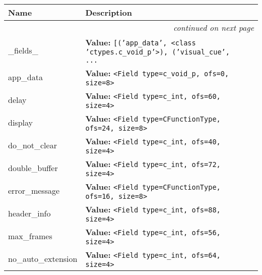     \vspace{-1cm}
\hspace{\varindent}\begin{longtable}{|p{\varnamewidth}|p{\vardescrwidth}|l}
\cline{1-2}
\cline{1-2} \centering \textbf{Name} & \centering \textbf{Description}& \\
\cline{1-2}
\endhead\cline{1-2}\multicolumn{3}{r}{\small\textit{continued on next page}}\\\endfoot\cline{1-2}
\endlastfoot\raggedright \_\-f\-i\-e\-l\-d\-s\-\_\- & \raggedright \textbf{Value:} 
{\tt \texttt{[}\texttt{(}\texttt{'}\texttt{app\_data}\texttt{'}\texttt{, }{\textless}class 'ctypes.c\_void\_p'{\textgreater}\texttt{)}\texttt{, }\texttt{(}\texttt{'}\texttt{visual\_cue}\texttt{'}\texttt{, }\texttt{...}}&\\
\cline{1-2}
\raggedright a\-p\-p\-\_\-d\-a\-t\-a\- & \raggedright \textbf{Value:} 
{\tt {\textless}Field type=c\_void\_p, ofs=0, size=8{\textgreater}}&\\
\cline{1-2}
\raggedright d\-e\-l\-a\-y\- & \raggedright \textbf{Value:} 
{\tt {\textless}Field type=c\_int, ofs=60, size=4{\textgreater}}&\\
\cline{1-2}
\raggedright d\-i\-s\-p\-l\-a\-y\- & \raggedright \textbf{Value:} 
{\tt {\textless}Field type=CFunctionType, ofs=24, size=8{\textgreater}}&\\
\cline{1-2}
\raggedright d\-o\-\_\-n\-o\-t\-\_\-c\-l\-e\-a\-r\- & \raggedright \textbf{Value:} 
{\tt {\textless}Field type=c\_int, ofs=40, size=4{\textgreater}}&\\
\cline{1-2}
\raggedright d\-o\-u\-b\-l\-e\-\_\-b\-u\-f\-f\-e\-r\- & \raggedright \textbf{Value:} 
{\tt {\textless}Field type=c\_int, ofs=72, size=4{\textgreater}}&\\
\cline{1-2}
\raggedright e\-r\-r\-o\-r\-\_\-m\-e\-s\-s\-a\-g\-e\- & \raggedright \textbf{Value:} 
{\tt {\textless}Field type=CFunctionType, ofs=16, size=8{\textgreater}}&\\
\cline{1-2}
\raggedright h\-e\-a\-d\-e\-r\-\_\-i\-n\-f\-o\- & \raggedright \textbf{Value:} 
{\tt {\textless}Field type=c\_int, ofs=88, size=4{\textgreater}}&\\
\cline{1-2}
\raggedright m\-a\-x\-\_\-f\-r\-a\-m\-e\-s\- & \raggedright \textbf{Value:} 
{\tt {\textless}Field type=c\_int, ofs=56, size=4{\textgreater}}&\\
\cline{1-2}
\raggedright n\-o\-\_\-a\-u\-t\-o\-\_\-e\-x\-t\-e\-n\-s\-i\-o\-n\- & \raggedright \textbf{Value:} 
{\tt {\textless}Field type=c\_int, ofs=64, size=4{\textgreater}}&\\

\end{longtable}
